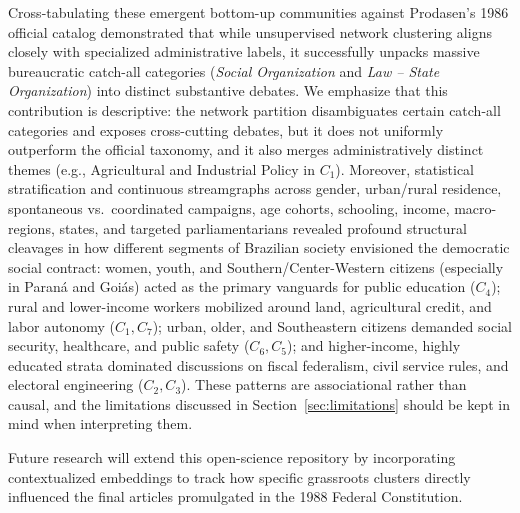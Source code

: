 \documentclass[pdflatex,sn-basic]{sn-jnl}
\begin{document}
Cross-tabulating these emergent bottom-up communities against Prodasen's 1986 official catalog demonstrated that while unsupervised network clustering aligns closely with specialized administrative labels, it successfully unpacks massive bureaucratic catch-all categories (\textit{Social Organization} and \textit{Law -- State Organization}) into distinct substantive debates. %
We emphasize that this contribution is descriptive: the network partition disambiguates certain catch-all categories and exposes cross-cutting debates, but it does not uniformly outperform the official taxonomy, and it also merges administratively distinct themes (e.g., Agricultural and Industrial Policy in $C_1$). Moreover, statistical stratification and continuous streamgraphs across gender, urban/rural residence, spontaneous vs.\ coordinated campaigns, age cohorts, schooling, income, macro-regions, states, and targeted parliamentarians revealed profound structural cleavages in how different segments of Brazilian society envisioned the democratic social contract: women, youth, and Southern/Center-Western citizens (especially in Paran\'{a} and Goi\'{a}s) acted as the primary vanguards for public education ($C_4$); rural and lower-income workers mobilized around land, agricultural credit, and labor autonomy ($C_1, C_7$); urban, older, and Southeastern citizens demanded social security, healthcare, and public safety ($C_6, C_5$); and higher-income, highly educated strata dominated discussions on fiscal federalism, civil service rules, and electoral engineering ($C_2, C_3$). These patterns are associational rather than causal, and the limitations discussed in Section~\ref{sec:limitations} should be kept in mind when interpreting them.

Future research will extend this open-science repository by incorporating contextualized embeddings \citep{amancio2025leveraging} to track how specific grassroots clusters directly influenced the final articles promulgated in the 1988 Federal Constitution.
\end{document}
